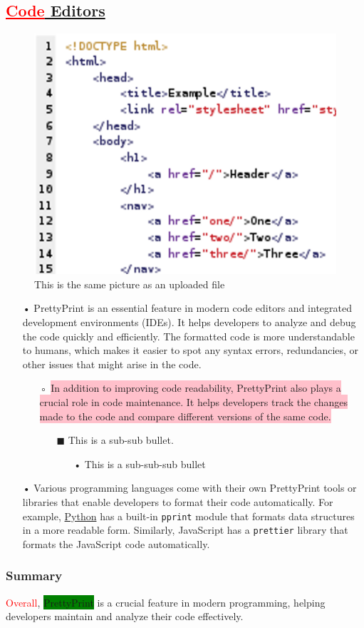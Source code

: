 \documentclass[12pt, a4paper]{article}
\makeatletter
\def\maxwidth#1{\ifdim\Gin@nat@width>#1 #1\else\Gin@nat@width\fi}
\makeatother
\begin{document}
\subsection{\textcolor{red}{\underline{Code}}\underline{ Editors}}
\begin{figure}[h]
\includegraphics[width=\maxwidth{\linewidth}]{PrettyPrint.png}
\centering
\caption{This is the same picture as an uploaded file}
\end{figure}
\begin{itemize}
\item[•] PrettyPrint is an essential feature in modern code editors and integrated development environments (IDEs).
 It helps developers to analyze and debug the code quickly and efficiently.
 The formatted code is more understandable to humans, which makes it easier to spot any syntax errors, redundancies, or other issues that might arise in the code.
\begin{itemize}
\item[◦] \colorbox{pink}{In addition to improving code readability, PrettyPrint also plays a crucial role in code maintenance.
 It helps developers track the changes made to the code and compare different versions of the same code.}
\begin{itemize}
\item[$\blacksquare$] This is a sub-sub bullet.
\begin{itemize}
\item[•] This is a sub-sub-sub bullet
\end{itemize}
\end{itemize}
\end{itemize}
\item[•] Various programming languages come with their own PrettyPrint tools or libraries that enable developers to format their code automatically.
 For example, \href{http://python.org/}{Python} has a built-in \texttt{pprint} module that formats data structures in a more readable form.
 Similarly, JavaScript has a \texttt{prettier} library that formats the JavaScript code automatically.
\end{itemize}
\subsubsection{Summary}
\textcolor{red}{Overall}, \colorbox{green}{PrettyPrint} is a crucial feature in modern programming, helping developers maintain and analyze their code effectively.
\end{document}
